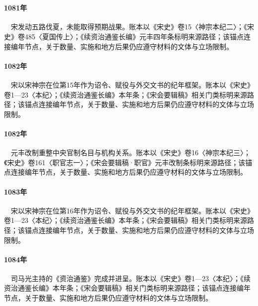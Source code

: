 \section{}

\paragraph{1081年}　宋发动五路伐夏，未能取得预期战果。账本以《宋史》卷15〈神宗本纪二〉；《宋史》卷485〈夏国传上〉；《续资治通鉴长编》元丰四年条标明来源路径；该锚点连接编年节点，关于数量、实施和地方后果仍应遵守材料的文体与立场限制。

\paragraph{1082年}　宋以宋神宗在位第15年作为诏令、赋役与外交文书的纪年框架。账本以《宋史》卷1—23〈本纪〉；《续资治通鉴长编》本年条；《宋会要辑稿》相关门类标明来源路径；该锚点连接编年节点，关于数量、实施和地方后果仍应遵守材料的文体与立场限制。

\paragraph{1082年}　元丰改制重整中央官制名目与机构关系。账本以《宋史》卷16〈神宗本纪三〉；《宋史》卷161〈职官志一〉；《宋会要辑稿·职官》元丰改制条标明来源路径；该锚点连接编年节点，关于数量、实施和地方后果仍应遵守材料的文体与立场限制。

\paragraph{1083年}　宋以宋神宗在位第16年作为诏令、赋役与外交文书的纪年框架。账本以《宋史》卷1—23〈本纪〉；《续资治通鉴长编》本年条；《宋会要辑稿》相关门类标明来源路径；该锚点连接编年节点，关于数量、实施和地方后果仍应遵守材料的文体与立场限制。

\paragraph{1084年}　司马光主持的《资治通鉴》完成并进呈。账本以《宋史》卷1—23〈本纪〉；《续资治通鉴长编》本年条；《宋会要辑稿》相关门类标明来源路径；该锚点连接编年节点，关于数量、实施和地方后果仍应遵守材料的文体与立场限制。


